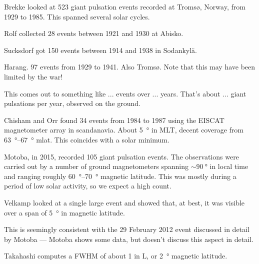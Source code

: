 \todo{$\cdots$}






Brekke\cite{brekke_1987} looked at 523 giant pulsation events recorded at Troms{\o}, Norway, from 1929 to 1985. This spanned several solar cycles. 

Rolf\cite{rolf_1931} collected 28 events between 1921 and 1930 at Abisko. 

Sucksdorf\cite{sucksdorff_1939} got 150 events between 1914 and 1938 in Sodankyl{\"a}. 

Harang\cite{harang_1941}. 97 events from 1929 to 1941. Also Troms{\o}. Note that this may have been limited by the war! 

This comes out to something like ... events over ... years. That's about ... giant pulsations per year, observed on the ground. 


Chisham and Orr\cite{chisham_1991} found 34 events from 1984 to 1987 using the EISCAT magnetometer array in scandanavia. About \SI{5}{\degree} in MLT, decent coverage from \SIrange{63}{67}{\degree} mlat. This coincides with a solar minimum. 

Motoba, in 2015, recorded 105 giant pulsation events. The observations were carried out by a number of ground magnetometers spanning $\sim \SI{90}{\degree}$ in local time and ranging roughly \SIrange{60}{70}{\degree} magnetic latitude\cite{motoba_2015}. This was mostly during a period of low solar activity, so we expect a high count. 


Velkamp\cite{veldkamp_1960} looked at a single large event and showed that, at best, it was visible over a span of \SI{5}{\degree} in magnetic latitude. 

This is seemingly consistent with the 29 February 2012 event discussed in detail by Motoba\cite{motoba_2015} --- Motoba shows some data, but doesn't discuss this aspect in detail. 

Takahashi\cite{takahashi_2011} computes a FWHM of about 1 in L, or \SI{2}{\degree} magnetic latitude. 

